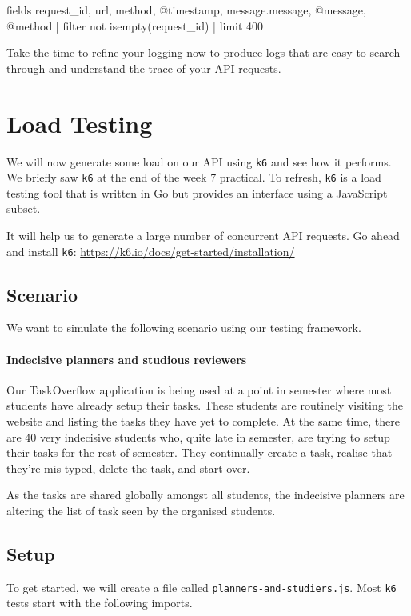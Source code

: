 \documentclass{csse4400}
\begin{document}
\begin{code}[numbers=none]{}
fields request_id, url, method, @timestamp, message.message, @message, @method
| filter not isempty(request_id)
| limit 400
\end{code}

Take the time to refine your logging now to produce logs that are easy to search through
and understand the trace of your API requests.


\section{Load Testing}

We will now generate some load on our API using \texttt{k6} and see how it performs.
We briefly saw \texttt{k6} at the end of the week 7 practical.
To refresh, \texttt{k6} is a load testing tool that is written in Go but provides an interface using a JavaScript subset.

It will help us to generate a large number of concurrent API requests.
Go ahead and install \texttt{k6}:
\url{https://k6.io/docs/get-started/installation/}

\subsection{Scenario}
We want to simulate the following scenario using our testing framework.

\paragraph{Indecisive planners and studious reviewers}
Our TaskOverflow application is being used at a point in semester where most students have already setup their tasks.
These students are routinely visiting the website and listing the tasks they have yet to complete.
At the same time, there are 40 very indecisive students who,
quite late in semester,
are trying to setup their tasks for the rest of semester.
They continually create a task,
realise that they're mis-typed,
delete the task,
and start over.

As the tasks are shared globally amongst all students,
the indecisive planners are altering the list of task seen by the organised students.

\subsection{Setup}
To get started,
we will create a file called \texttt{planners-and-studiers.js}.
Most \texttt{k6} tests start with the following imports.
\end{document}
